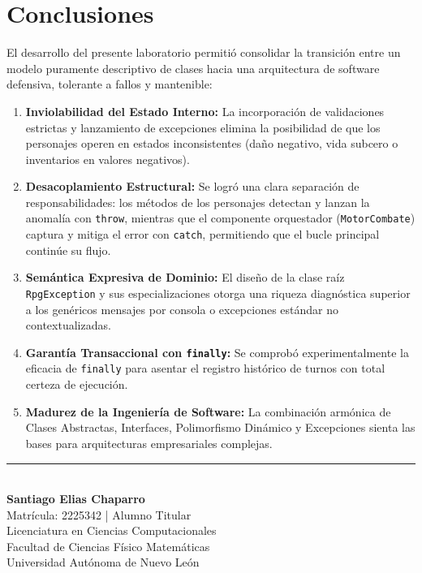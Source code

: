 \documentclass[11pt,letterpaper]{article}
\begin{document}
\section{Conclusiones}

El desarrollo del presente laboratorio permitió consolidar la transición entre un modelo puramente descriptivo de clases hacia una arquitectura de software defensiva, tolerante a fallos y mantenible:

\begin{enumerate}
    \item \textbf{Inviolabilidad del Estado Interno:} La incorporación de validaciones estrictas y lanzamiento de excepciones elimina la posibilidad de que los personajes operen en estados inconsistentes (daño negativo, vida subcero o inventarios en valores negativos).
    \item \textbf{Desacoplamiento Estructural:} Se logró una clara separación de responsabilidades: los métodos de los personajes detectan y lanzan la anomalía con \texttt{throw}, mientras que el componente orquestador (\texttt{MotorCombate}) captura y mitiga el error con \texttt{catch}, permitiendo que el bucle principal continúe su flujo.
    \item \textbf{Semántica Expresiva de Dominio:} El diseño de la clase raíz \texttt{RpgException} y sus especializaciones otorga una riqueza diagnóstica superior a los genéricos mensajes por consola o excepciones estándar no contextualizadas.
    \item \textbf{Garantía Transaccional con \texttt{finally}:} Se comprobó experimentalmente la eficacia de \texttt{finally} para asentar el registro histórico de turnos con total certeza de ejecución.
    \item \textbf{Madurez de la Ingeniería de Software:} La combinación armónica de Clases Abstractas, Interfaces, Polimorfismo Dinámico y Excepciones sienta las bases para arquitecturas empresariales complejas.
\end{enumerate}

\vspace{1.5cm}
\begin{center}
    \rule{8cm}{0.4pt}\\[0.2cm]
    \textbf{Santiago Elias Chaparro}\\
    \small Matrícula: 2225342 | Alumno Titular\\
    Licenciatura en Ciencias Computacionales\\
    Facultad de Ciencias Físico Matemáticas\\
    Universidad Autónoma de Nuevo León
\end{center}
\end{document}

